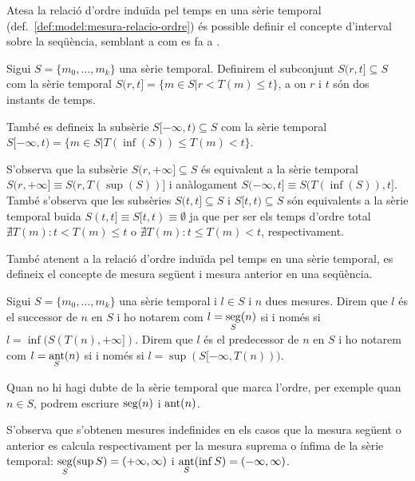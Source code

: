 Atesa la relació d'ordre induïda pel temps en una sèrie temporal
(def.\ \ref{def:model:mesura-relacio-ordre}) és possible definir el
concepte d'interval sobre la seqüència, semblant a com es fa a \cite{last:keogh,last:hetland}.

\begin{definition}[Interval]
  \label{def:model:st-interval}
  Sigui $S=\{m_0, \ldots, m_k\}$ una sèrie temporal. Definirem el subconjunt
  $S(r,t] \subseteq S$ com la sèrie temporal $S(r,t]=\{m\in S
  | r<T(m)\leq t\}$, a on $r$ i $t$ són dos instants de temps.

  També es defineix la subsèrie $S[-\infty,t)\subseteq S$ com la sèrie
  temporal $S[-\infty,t) = \{m\in S | T(\inf(S))\leq T(m) < t\}$.
\end{definition}
S'observa que la subsèrie $S(r,+\infty]\subseteq S$ és
equivalent a la sèrie temporal $S(r,+\infty] \equiv S(r,T(\sup(S))]$ i
anàlogament $S(-\infty,t] \equiv S(T(\inf(S)),t]$. També s'observa que les subsèries $S(t,t]\subseteq S$ i $S[t,t)\subseteq S$ són equivalents a la sèrie temporal buida $S(t,t] \equiv S[t,t) \equiv \emptyset$ ja que per ser els temps d'ordre total $\nexists T(m): t < T(m) \leq t$ o $\nexists T(m): t \leq T(m) < t$, respectivament. 
 
També atenent a la relació d'ordre induïda pel temps en una sèrie temporal, es
defineix el concepte de mesura següent i mesura anterior en una
seqüència.

\begin{definition}
  Sigui $S=\{m_0, \ldots, m_k\}$ una sèrie temporal i $l\in S$ i $n$ dues
  mesures. Direm que $l$ és el successor de $n$ en $S$ i ho notarem
  com $l=\operatorname*{seg}\limits_S(n)$ si i només si $l=\inf(S(T(n),+\infty])$.
  Direm que $l$ és el predecessor de $n$ en $S$ i ho notarem com
  $l=\operatorname*{ant}\limits_S(n)$ si i només si $l=\sup(S[-\infty,T(n)))$.

Quan no hi hagi dubte de la sèrie temporal que marca l'ordre, per
exemple quan $n\in S$, podrem escriure $\operatorname*{seg}(n)$ i $\operatorname*{ant}(n)$.
\end{definition}
S'observa que s'obtenen mesures indefinides en els casos que la
mesura següent o anterior es calcula respectivament per la mesura
suprema o ínfima de la sèrie temporal: $\operatorname*{seg}\limits_S(\sup
S)=(+\infty,\infty)$ i $\operatorname*{ant}\limits_S(\inf S)=(-\infty,\infty)$.

